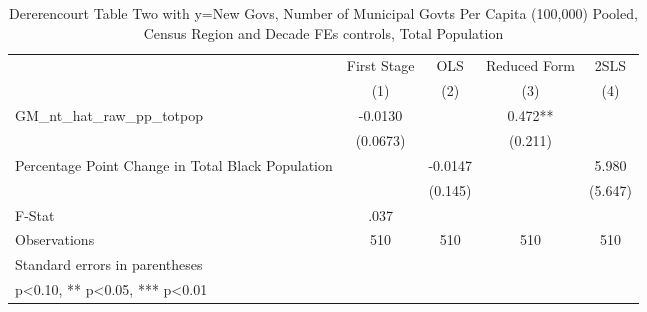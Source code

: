 \begin{table}[htbp]\centering
\def\sym#1{\ifmmode^{#1}\else\(^{#1}\)\fi}
\caption{Dererencourt Table Two with y=New Govs, Number of Municipal Govts Per Capita (100,000) Pooled, Census Region and Decade FEs controls, Total Population}
\begin{tabular}{l*{4}{c}}
\toprule
                    & First Stage   &         OLS   &Reduced Form   &        2SLS   \\
                    &\multicolumn{1}{c}{(1)}   &\multicolumn{1}{c}{(2)}   &\multicolumn{1}{c}{(3)}   &\multicolumn{1}{c}{(4)}   \\
\midrule
GM\_nt\_hat\_raw\_pp\_totpop&     -0.0130   &               &       0.472** &               \\
                    &    (0.0673)   &               &     (0.211)   &               \\
\addlinespace
Percentage Point Change in Total Black Population&               &     -0.0147   &               &       5.980   \\
                    &               &     (0.145)   &               &     (5.647)   \\
\midrule
F-Stat              &        .037   &               &               &               \\
Observations        &         510   &         510   &         510   &         510   \\
\bottomrule
\multicolumn{5}{l}{\footnotesize Standard errors in parentheses}\\
\multicolumn{5}{l}{\footnotesize * p<0.10, ** p<0.05, *** p<0.01}\\
\end{tabular}
\end{table}
